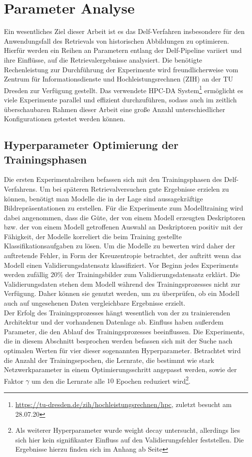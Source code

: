 \chapter{Parameter Analyse}

Ein wesentliches Ziel dieser Arbeit ist es das Delf-Verfahren insbesondere für den Anwendungsfall des Retrievals von historischen Abbildungen zu optimieren. Hierfür werden ein Reihen an Parametern entlang der Delf-Pipeline variiert und ihre Einflüsse, auf die Retrievalergebnisse analysiert.
Die benötigte Rechenleistung zur Durchführung der Experimente wird freundlicherweise vom 
Zentrum für Informationsdienste und Hochleistungsrechnen (ZIH) an der TU Dresden zur Verfügung gestellt. Das verwendete HPC-DA System\footnote{\url{https://tu-dresden.de/zih/hochleistungsrechnen/hpc}, zuletzt besucht am 28.07.20} ermöglicht es viele Experimente parallel und effizient durchzuführen, sodass auch im zeitlich überschaubaren Rahmen dieser Arbeit eine große Anzahl unterschiedlicher Konfigurationen getestet werden können.

\section{Hyperparameter Optimierung der Trainingsphasen}
Die ersten Experimentalreihen befassen sich mit den Trainingsphasen des Delf-Verfahrens. Um bei späteren Retrievalversuchen gute Ergebnisse erzielen zu können, benötigt man Modelle die in der Lage sind aussagekräftige Bildrepräsentationen zu erstellen. Für die Experimente zum Modelltraining wird dabei angenommen, dass die Güte, der von einem Modell erzeugten Deskriptoren bzw. der von einem Modell getroffenen Auswahl an Deskriptoren positiv mit der Fähigkeit, der Modelle korreliert die beim Training gestellte Klassifikationsaufgaben zu lösen. Um die Modelle zu bewerten wird daher der auftretende Fehler, in Form der Kreuzentropie betrachtet, der auftritt wenn das Modell einen Validierungsdatensatz klassifiziert. Vor Beginn jedes Experiments werden zufällig $20\%$ der Trainingsbilder zum Validierungsdatensatz erklärt. Die Validierungsdaten stehen dem Modell während des Trainingsprozesses nicht zur Verfügung. Daher können sie genutzt werden, um zu überprüfen, ob ein Modell auch auf ungesehenen Daten vergleichbare Ergebnisse erzielt.
\\
Der Erfolg des Trainingsprozesses hängt wesentlich von der zu trainierenden Architektur und der vorhandenen Datenlage ab. Einfluss haben außerdem Parameter, die den Ablauf des Trainingsprozesses beeinflussen. Die Experiments, die in diesem Abschnitt besprochen werden befassen sich mit der Suche nach optimalen Werten für vier dieser sogenannten Hyperparameter. Betrachtet wird die Anzahl der Trainingsepochen, die Lernrate, die bestimmt wie stark Netzwerkparameter in einem Optimierungsschritt angepasst werden, sowie der Faktor $\gamma$ um den die Lernrate alle $10$ Epochen reduziert wird\footnote{Als weiterer Hyperparameter wurde weight decay untersucht, allerdings lies sich hier kein signifikanter Einfluss auf den Validierungsfehler feststellen. Die Ergebnisse hierzu finden sich im Anhang ab Seite \pageref{weight_decay}}.

